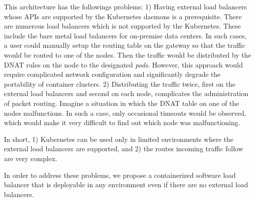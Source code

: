 This architecture has the followings problems: 
1) Having external load balancers whose APIs are supported by the Kubernetes daemons is a prerequisite. 
There are numerous load balancers which is not supported by the Kubernetes.
These include the bare metal load balancers for on-premise data centers.  
In such cases, a user could manually setup the routing table on the gateway so that the traffic would be routed to one of the nodes.
Then the traffic would be distributed by the DNAT rules on the node to the designated {\em pods}.
However, this approach would require complicated network configuration and significantly degrade the portability of container clusters.
2) Distributing the traffic twice, first on the external load balancers and second on each node, 
complicates the administration of packet routing. 
Imagine a situation in which the DNAT table on one of the nodes malfunctions.
In such a case, only occasional timeouts would be observed, which would make it very difficult to find out which node was malfunctioning.   

In short, 1) Kubernetes can be used only in limited environments where the external load balancers are supported, 
and 2) the routes incoming traffic follow are very complex.

In order to address these problems, we propose a containerized software load balancer 
that is deployable in any environment even if there are no external load balancers.
